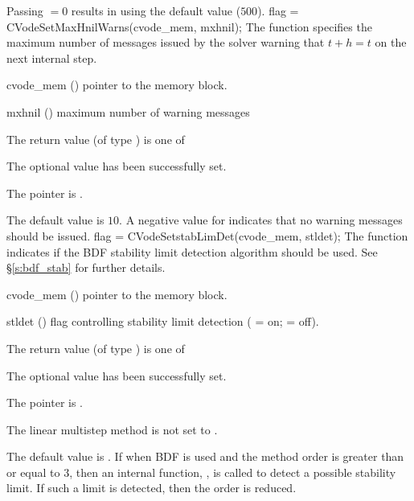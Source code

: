 {
   Passing $=0$ results in {\cvodes} using the default value ($500$).
}
{
flag = CVodeSetMaxHnilWarns(cvode\_mem, mxhnil);
}
{
  The function  specifies the maximum number of
  messages issued by the solver warning that $t+h=t$ on the next internal step.
}
{
  \begin{args}
  \item[cvode\_mem] ()
    pointer to the {\cvodes} memory block.
  \item[mxhnil] ()
    maximum number of warning messages
  \end{args}
}
{
  The return value  (of type ) is one of
  \begin{args}
  \item[\Id{CV\_SUCCESS}] 
    The optional value has been successfully set.
  \item[\Id{CV\_MEM\_NULL}]
    The  pointer is .
  \end{args}
}
{
  The default value is $10$.
  A negative value for  indicates that no warning messages should
  be issued.
}
{
flag = CVodeSetstabLimDet(cvode\_mem, stldet);
}
{
  The function  indicates if
  the BDF stability limit detection algorithm should be used. See \S\ref{s:bdf_stab}
  for further details.
}
{
  \begin{args}
  \item[cvode\_mem] ()
    pointer to the {\cvodes} memory block.
  \item[stldet] ()
    flag controlling stability limit detection ( = on;  = off).
  \end{args}
}
{
  The return value  (of type ) is one of
  \begin{args}
  \item[\Id{CV\_SUCCESS}] 
    The optional value has been successfully set.
  \item[\Id{CV\_MEM\_NULL}]
    The  pointer is .
  \item[\Id{CV\_ILL\_INPUT}]
    The linear multistep method is not set to .
  \end{args}
}
{
  The default value is . If  when BDF is used
  and the method order is greater than or equal to 3, then an internal function, ,
  is called to detect a possible stability limit. If such a limit is detected, then the order is
  reduced.
}
